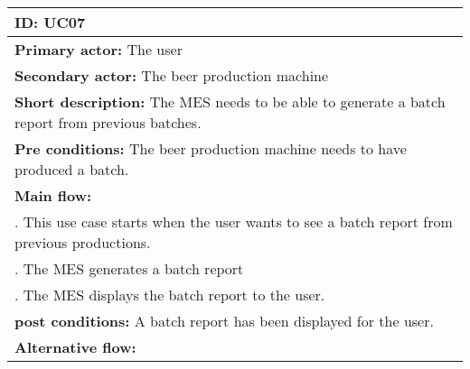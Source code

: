 \begin{table}[ht]
    \begin{tabularx}{\textwidth}{|>{\RaggedRight}X|}
        \hline
        \textbf{ID:} UC07  \\
        \hline
        \textbf{Primary actor:} The user \\
        \hline
        \textbf{Secondary actor:} The beer production machine \\
        \hline
        \textbf{Short description:} The MES needs to be able to generate a batch
        report from previous batches. \\
        \hline
        \textbf{Pre conditions:} The beer production machine needs to have
        produced a batch. \\
        \hline
        \textbf{Main flow:} \\
        	1. This use case starts when the user wants to see a batch report
        	from previous productions. \\
			2. The MES generates a batch report \\
			3. The MES displays the batch report to the user. \\
		\hline
        \textbf{post conditions:} A batch report has been displayed for the
        user. \\
        \hline
        \textbf{Alternative flow:} \\
        \hline
    \end{tabularx}
    \label{table:usecase_batchReport}
\end{table}
